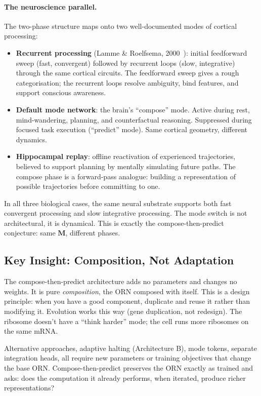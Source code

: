 \documentclass[11pt, a4paper]{article}
\newcommand{\M}{\mathbf{M}}
\theoremstyle{plain}
\theoremstyle{definition}
\theoremstyle{remark}
\begin{document}
\paragraph{The neuroscience parallel.}
The two-phase structure maps onto two well-documented modes of cortical processing:
\begin{itemize}[nosep]
    \item \textbf{Recurrent processing} (Lamme \& Roelfsema, 2000~\cite{lamme2000distinct}): initial feedforward sweep (fast, convergent) followed by recurrent loops (slow, integrative) through the same cortical circuits.  The feedforward sweep gives a rough categorisation; the recurrent loops resolve ambiguity, bind features, and support conscious awareness.
    \item \textbf{Default mode network}: the brain's ``compose'' mode.  Active during rest, mind-wandering, planning, and counterfactual reasoning.  Suppressed during focused task execution (``predict'' mode).  Same cortical geometry, different dynamics.
    \item \textbf{Hippocampal replay}: offline reactivation of experienced trajectories, believed to support planning by mentally simulating future paths.  The compose phase is a forward-pass analogue: building a representation of possible trajectories before committing to one.
\end{itemize}

In all three biological cases, the same neural substrate supports both fast convergent processing and slow integrative processing.
The mode switch is not architectural, it is dynamical.
This is exactly the compose-then-predict conjecture: same $\M$, different phases.

\subsection{Key Insight: Composition, Not Adaptation}

The compose-then-predict architecture adds no parameters and changes no weights.
It is pure \emph{composition}, the ORN composed with itself.
This is a design principle: when you have a good component, duplicate and reuse it rather than modifying it.
Evolution works this way (gene duplication, not redesign).
The ribosome doesn't have a ``think harder'' mode; the cell runs more ribosomes on the same mRNA.

Alternative approaches, adaptive halting (Architecture B), mode tokens, separate integration heads, all require new parameters or training objectives that change the base ORN.
Compose-then-predict preserves the ORN exactly as trained and asks: does the computation it already performs, when iterated, produce richer representations?
\end{document}
